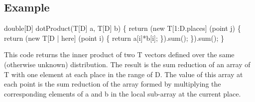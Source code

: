 \subsection{Example}
\begin{x10}
    double[D] dotProduct(T[D] a, T[D] b) \{
    return (new T[1:D.places] (point j) \{
        return (new T[D | here] (point i) \{
            return a[i]*b[i];
        \}).sum();
   \}).sum();
\}
\end{x10}

This code returns the inner product of two {\cf T} vectors defined
over the same (otherwise unknown) distribution. The result is the sum
reduction of an array of {\cf T} with one element at each place in the
range of {\cf D}. The value of this array at each point is the sum
reduction of the array formed by multiplying the corresponding
elements of {\cf a} and {\cf b} in the local sub-array at the current
place.



